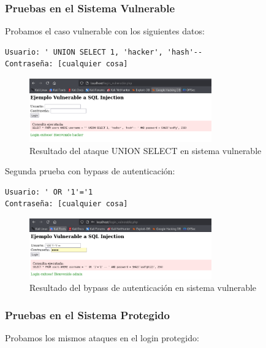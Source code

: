 \documentclass[12pt,a4paper]{article}
\begin{document}
\subsubsection{Pruebas en el Sistema Vulnerable}

Probamos el caso vulnerable con los siguientes datos:

\begin{lstlisting}[caption=Ataque SQL Injection - UNION SELECT]
Usuario: ' UNION SELECT 1, 'hacker', 'hash'-- 
Contraseña: [cualquier cosa]
\end{lstlisting}

\begin{figure}[H]
    \centering
    \includegraphics[width=0.7\textwidth]{./assets/img10.png}
    \caption{Resultado del ataque UNION SELECT en sistema vulnerable}
    \label{fig:ataque-union}
\end{figure}

Segunda prueba con bypass de autenticación:

\begin{lstlisting}[caption=Ataque SQL Injection - Bypass de autenticación]
Usuario: ' OR '1'='1
Contraseña: [cualquier cosa]
\end{lstlisting}

\begin{figure}[H]
    \centering
    \includegraphics[width=0.7\textwidth]{./assets/img11.png}
    \caption{Resultado del bypass de autenticación en sistema vulnerable}
    \label{fig:bypass-vulnerable}
\end{figure}

\subsubsection{Pruebas en el Sistema Protegido}

Probamos los mismos ataques en el login protegido:
\end{document}
